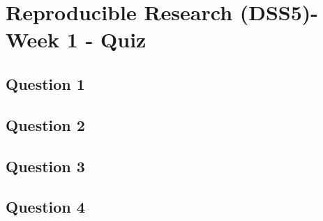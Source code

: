 \documentclass[french]{article}
\begin{document}
\section*{Reproducible Research (DSS5)- Week 1 - Quiz}
\newpage
\subsection*{Question 1}

\newpage
\subsection*{Question 2}


\newpage
\subsection*{Question 3}


\newpage
\subsection*{Question 4}
\end{document}
